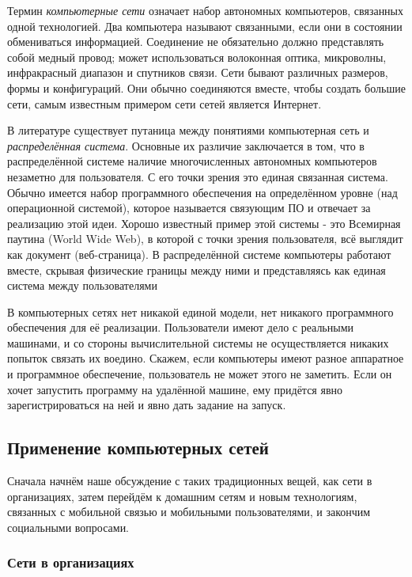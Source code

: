     \par Термин \textit{компьютерные сети} означает набор автономных компьютеров, связанных одной технологией. Два компьютера называют связанными, если они в состоянии обмениваться информацией.  Соединение не обязательно должно представлять собой медный провод; может использоваться волоконная оптика, микроволны, инфракрасный диапазон и спутников связи. Сети бывают различных размеров, формы и конфигураций. Они обычно соединяются вместе, чтобы создать большие сети, самым известным примером сети сетей является Интернет. 
    
    \par В литературе существует путаница между понятиями компьютерная сеть и \textit{распределённая система}. Основные их различие заключается в том, что в распределённой системе наличие многочисленных автономных компьютеров незаметно для пользователя. С его точки зрения это единая связанная система. Обычно имеется набор программного обеспечения на определённом уровне (над операционной системой), которое называется связующим ПО и отвечает за реализацию этой идеи. Хорошо известный пример этой системы - это Всемирная паутина (World Wide Web), в которой с точки зрения пользователя, всё выглядит как документ (веб-страница). В распределённой системе компьютеры работают вместе, скрывая физические границы между ними и представляясь как единая система между пользователями 
	
	\par В компьютерных сетях нет никакой единой модели, нет никакого программного обеспечения для её реализации. Пользователи имеют дело с реальными машинами, и со стороны вычислительной системы не осуществляется никаких попыток связать их воедино. Скажем, если компьютеры имеют разное аппаратное и программное обеспечение, пользователь не может этого не заметить. Если он хочет запустить программу на удалённой машине, ему придётся явно зарегистрироваться на ней и явно дать задание на запуск. 
	
	\subsection{Применение компьютерных сетей}
	
    Сначала начнём наше обсуждение с таких традиционных вещей, как сети в организациях, затем перейдём к домашним сетям и новым технологиям, связанных с мобильной связью и мобильными пользователями, и закончим социальными вопросами.
    
    \subsubsection{Сети в организациях}
    
